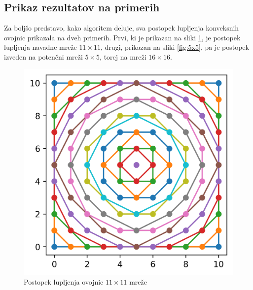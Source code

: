 \documentclass[a4paper]{article}
\begin{document}
\newpage
\subsection{Prikaz rezultatov na primerih}
Za boljšo predstavo, kako algoritem deluje, sva postopek lupljenja konveksnih ovojnic prikazala na dveh primerih. Prvi, ki je prikazan na sliki \ref{fig:11x11}, je postopek lupljenja navadne mreže
$11 \times 11$, drugi, prikazan na sliki \ref{fig:5x5}, pa je postopek izveden na potenčni mreži $5 \times 5$, torej na mreži $16 \times 16$.
\begin{figure}[!h]
	\centering
	\caption{Postopek lupljenja ovojnic $11 \times 11$ mreže}
	\label{fig:11x11}
	\vspace{2mm}
	\includegraphics[scale=0.7]{11x11_enakomerna.png}
\end{figure}
\end{document}
